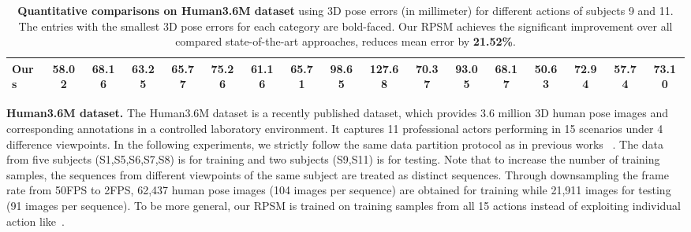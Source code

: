\documentclass[10pt,twocolumn,letterpaper]{article}
\begin{document}
\begin{table*}[tp]
\begin{adjustbox}{max width=1.0\textwidth}
\begin{tabular}{@{}l|ccccccccccccccc|c@{}}
	Ours & 58.02 & 68.16 & \textbf{63.25} & \textbf{65.77} & \textbf{75.26} & \textbf{61.16} & \textbf{65.71} & \textbf{98.65} & \textbf{127.68} & \textbf{70.37} & \textbf{93.05} & 68.17 & \textbf{50.63} & \textbf{72.94} & \textbf{57.74} & \textbf{73.10} \\
\bottomrule
	\end{tabular}
	\end{adjustbox}
	\vspace{-10pt}
	\caption{\textbf{Quantitative comparisons on Human3.6M dataset} using 3D pose errors (in millimeter) for different actions of subjects 9 and 11. The entries with the smallest 3D pose errors for each category are bold-faced. Our RPSM achieves the significant improvement over all compared state-of-the-art approaches, \ie reduces mean error by \textbf{21.52\%}. }
	\label{table:h3m_res}
\vspace{-10pt}
\end{table*}


\textbf{Human3.6M dataset.} The Human3.6M dataset is a recently published dataset, which provides 3.6 million 3D human pose images and corresponding annotations in a controlled laboratory environment. It captures 11 professional actors performing in 15 scenarios under 4 difference viewpoints. In the following experiments, we strictly follow the same data partition protocol as in previous works
~\cite{zhou2015sparseness,li2015maximum,zhou2016deep,Tekin_2016_CVPR,DBLP:conf/eccv/DuWLHGWKG16,DBLP:conf/eccv/SanzariNP16}. The data from five subjects (S1,S5,S6,S7,S8) is for training and two subjects (S9,S11) is for testing. Note that to increase the number of training samples, the sequences from different viewpoints of the same subject are treated as distinct sequences. 
Through downsampling the frame rate from 50FPS to 2FPS, 62,437 human pose images (104 images per sequence) are obtained for training while 21,911 images for testing (91 images per sequence). To be more general, our RPSM is trained on training samples from all 15 actions instead of exploiting individual action like~\cite{zhou2015sparseness,li2015maximum}.
\end{document}
